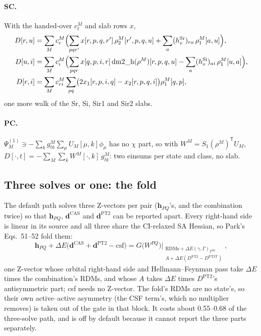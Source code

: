 \documentclass[11pt]{article}
\newcommand{\T}{\mathsf T}
\begin{document}
\paragraph{SC.} With the handed-over $c^M_t$ and slab rows $x$,
\begin{align}
  D[r,u] &= \sum_M c^M_r\Bigl(\sum_{pqr'}x[r,p,q,r']\,\rho_2^M[r',p,q,u] + \sum_a (h_v^{\mathrm{Sr}})_{ra}\,\rho_1^M[a,u]\Bigr),\\
  D[u,i] &= \sum_M c^M_i\Bigl(\sum_{pqr}x[q,p,i,r]\,\mathrm{dm2\_h}(\rho^M)[r,p,q,u] - \sum_a (h_v^{\mathrm{Si}})_{ai}\,\rho_1^M[u,a]\Bigr),\\
  D[r,i] &= \sum_M c^M_{ri}\sum_{pq}\bigl(2x_1[r,p,i,q] - x_2[r,p,q,i]\bigr)\rho_1^M[q,p],
\end{align}
one more walk of the Sr, Si, Sir1 and Sir2 slabs.

\paragraph{PC.} $\Psi^{(1)}_M \ni -\sum_k g^M_{tk}\sum_\mu U_M[\mu,k]\phi_\mu$
has no $\chi$ part, so with $W^M = S_1(\rho^M)^\T U_M$,
$D[\cdot, t] = -\sum_M\sum_k W^M[\cdot, k]\,g^M_{tk}$: two einsums per state
and class, no slab.

\subsection{Three solves or one: the fold}

The default path solves three Z-vectors per pair ($\mathbf h_{PQ}$'s, and
the combination twice) so that $\mathbf h_{PQ}$, $\mathbf d^{\mathrm{CAS}}$
and $\mathbf d^{\mathrm{PT2}}$ can be reported apart. Every right-hand side
is linear in its source and all three share the CI-relaxed SA Hessian, so
Park's Eqs.~51--52 \cite{park2020} fold them:
\begin{equation}
  \mathbf h_{PQ} + \Delta E\bigl(\mathbf d^{\mathrm{CAS}} + \mathbf d^{\mathrm{PT2}} - \mathrm{csf}\bigr)
  = G\bigl(W^{PQ}\bigr)\Big|_{\substack{\text{RDMs} + \Delta E(\gamma, \Gamma)_{T^{PQ}}\\ A + \Delta E(D^{\mathrm{PT2}} - D^{\mathrm{PT2}\T})}},
\end{equation}
one Z-vector whose orbital right-hand side and Hellmann--Feynman pass take
$\Delta E$ times the combination's RDMs, and whose $A$ takes $\Delta E$
times $D^{\mathrm{PT2}}$'s antisymmetric part; csf needs no Z-vector. The
fold's RDMs are no state's, so their own active--active asymmetry
(the CSF term's, which no multiplier removes) is taken out of the gate in
that block. It costs about 0.55--0.68 of the three-solve path, and is off by
default because it cannot report the three parts separately.
\end{document}
